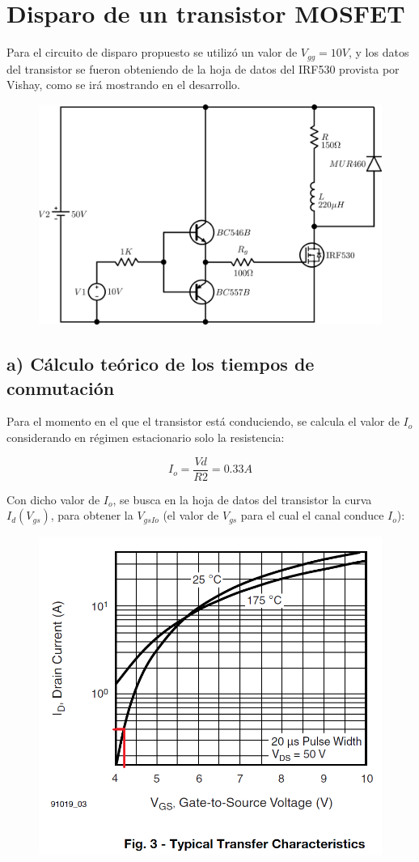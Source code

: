 \documentclass[e4_tp1_main.tex]{subfiles}
\begin{document}
\section{Disparo de un transistor MOSFET}

Para el circuito de disparo propuesto se utilizó un valor de $V_{gg}=10V$, y los datos del transistor se fueron obteniendo de la hoja de datos del IRF530 provista por Vishay, como se irá mostrando en el desarrollo.

\begin{figure}[H]
\centering
\includegraphics[width=0.7\linewidth]{Imagenes/Punto1/CircuitoDisparo.png}
\end{figure}

\subsection*{a) Cálculo teórico de los tiempos de conmutación}

Para el momento en el que el transistor está conduciendo, se calcula el valor de $I_o$ considerando en régimen estacionario solo la resistencia:

\[
I_o = \frac{Vd}{R2} = 0.33A
\]

Con dicho valor de $I_o$, se busca en la hoja de datos del transistor la curva $I_d(V_{gs})$, para obtener la $V_{gsIo}$ (el valor de $V_{gs}$ para el cual el canal conduce $I_o$):

\begin{figure}[H]
\centering
\includegraphics[width=0.5\linewidth]{Imagenes/Punto1/Ej1-VgsIo.png}
\end{figure}
\end{document}

